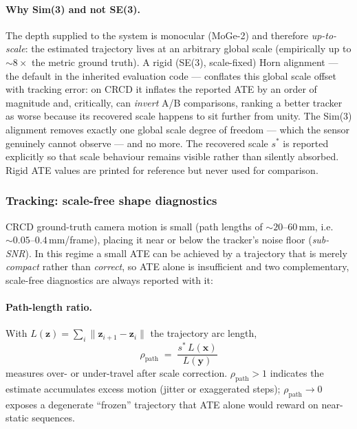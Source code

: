 \paragraph{Why Sim(3) and not SE(3).}
The depth supplied to the system is monocular (MoGe-2) and therefore
\emph{up-to-scale}: the estimated trajectory lives at an arbitrary global scale
(empirically up to ${\sim}8\times$ the metric ground truth). A rigid (SE(3),
scale-fixed) Horn alignment --- the default in the inherited evaluation code ---
conflates this global scale offset with tracking error: on CRCD it inflates the
reported ATE by an order of magnitude and, critically, can \emph{invert} A/B
comparisons, ranking a better tracker as worse because its recovered scale happens
to sit further from unity. The Sim(3) alignment removes exactly one global scale
degree of freedom --- which the sensor genuinely cannot observe --- and no more.
The recovered scale $s^\ast$ is reported explicitly so that scale behaviour remains
visible rather than silently absorbed. Rigid ATE values are printed for reference
but never used for comparison.

\subsubsection{Tracking: scale-free shape diagnostics}
\label{sec:eval_shape}

CRCD ground-truth camera motion is small (path lengths of ${\sim}20$--$60$\,mm,
i.e.\ ${\sim}0.05$--$0.4$\,mm/frame), placing it near or below the tracker's noise
floor (\emph{sub-SNR}). In this regime a small ATE can be achieved by a trajectory
that is merely \emph{compact} rather than \emph{correct}, so ATE alone is
insufficient and two complementary, scale-free diagnostics are always reported
with it:

\paragraph{Path-length ratio.} With $L(\mathbf{z}) = \sum_i \lVert \mathbf{z}_{i+1}
- \mathbf{z}_i \rVert$ the trajectory arc length,
\begin{equation}
  \rho_{\mathrm{path}} \;=\; \frac{s^\ast \, L(\mathbf{x})}{L(\mathbf{y})}
\end{equation}
measures over- or under-travel after scale correction. $\rho_{\mathrm{path}} > 1$
indicates the estimate accumulates excess motion (jitter or exaggerated steps);
$\rho_{\mathrm{path}} \to 0$ exposes a degenerate ``frozen'' trajectory that ATE
alone would reward on near-static sequences.

